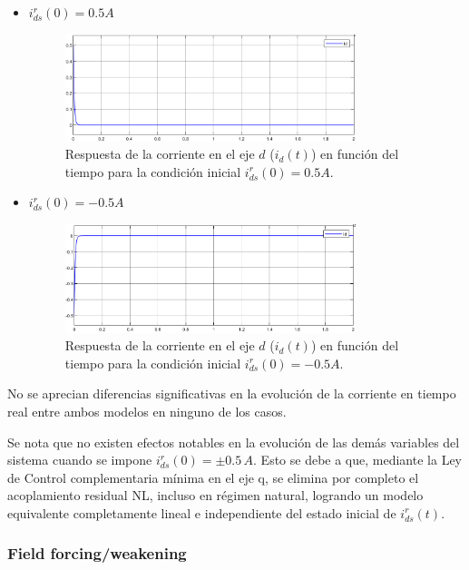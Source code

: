 \documentclass{article}
\begin{document}
\begin{itemize}
    \item $i^r_{ds}(0) = 0.5 A$
    
    \begin{figure}[H]
        \centering
        \includegraphics[width=0.8\textwidth]{5.1.6_cid3.png}
        \caption{Respuesta de la corriente en el eje $d$ ($i_d(t)$) en función del tiempo para la condición inicial $i^r_{ds}(0) = 0.5 A$.}
    \end{figure}

    \item $i^r_{ds}(0) = -0.5 A$
    
    \begin{figure}[H]
        \centering
        \includegraphics[width=0.8\textwidth]{5.1.6_cid4.png}
        \caption{Respuesta de la corriente en el eje $d$ ($i_d(t)$) en función del tiempo para la condición inicial $i^r_{ds}(0) = -0.5 A$.}
    \end{figure}
\end{itemize}

No se aprecian diferencias significativas en la evolución de la corriente en tiempo real entre ambos 
modelos en ninguno de los casos.

Se nota que no existen efectos notables en la evolución de las demás variables del sistema cuando se 
impone $i^r_{ds}(0) = ±0.5 \, A$. Esto se debe a que, mediante la Ley de Control complementaria mínima en el 
eje q, se elimina por completo el acoplamiento residual NL, incluso en régimen natural, logrando un 
modelo equivalente completamente lineal e independiente del estado inicial de $i^r_{ds}(t)$.

\subsubsection{Field forcing/weakening}
\end{document}
